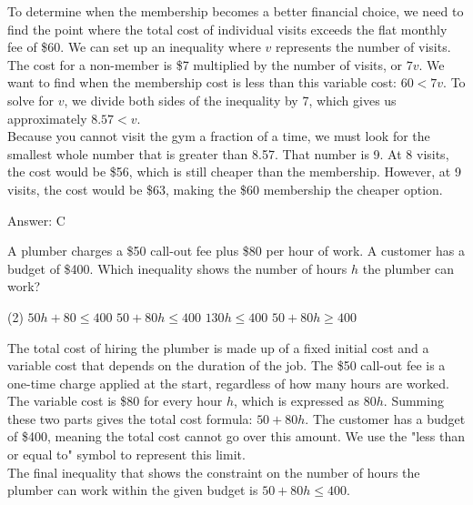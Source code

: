 \documentclass[11pt,paper=a4,answers]{exam}
\begin{document}
\begin{questions}
\begin{solution}
To determine when the membership becomes a better financial choice, we need to find the point where the total cost of individual visits exceeds the flat monthly fee of \$60. We can set up an inequality where $v$ represents the number of visits.
\\[10pt]
The cost for a non-member is \$7 multiplied by the number of visits, or $7v$. We want to find when the membership cost is less than this variable cost: $60 < 7v$. To solve for $v$, we divide both sides of the inequality by 7, which gives us approximately $8.57 < v$.
\\[10pt]
Because you cannot visit the gym a fraction of a time, we must look for the smallest whole number that is greater than 8.57. That number is 9. At 8 visits, the cost would be \$56, which is still cheaper than the membership. However, at 9 visits, the cost would be \$63, making the \$60 membership the cheaper option.

\vspace{15pt}
Answer: \colorbox{yellow!100}{C}
\end{solution}

\question
A plumber charges a \$50 call-out fee plus \$80 per hour of work. A customer has a budget of \$400. Which inequality shows the number of hours $h$ the plumber can work?
\begin{tasks}(2)
    \task $50h + 80 \leq 400$
    \task $50 + 80h \leq 400$
    \task $130h \leq 400$
    \task $50 + 80h \geq 400$
\end{tasks}

\begin{solution}
The total cost of hiring the plumber is made up of a fixed initial cost and a variable cost that depends on the duration of the job. The \$50 call-out fee is a one-time charge applied at the start, regardless of how many hours are worked.
\\[10pt]
The variable cost is \$80 for every hour $h$, which is expressed as $80h$. Summing these two parts gives the total cost formula: $50 + 80h$. The customer has a budget of \$400, meaning the total cost cannot go over this amount. We use the "less than or equal to" symbol to represent this limit.
\\[10pt]
The final inequality that shows the constraint on the number of hours the plumber can work within the given budget is $50 + 80h \leq 400$. 


\end{solution}
\end{questions}
\end{document}
